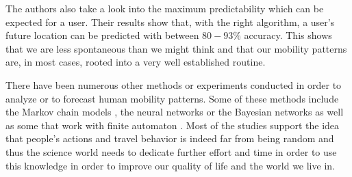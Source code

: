 The authors also take a look into the maximum predictability which can be
expected for a user. Their results show that, with the right algorithm, a user's
future location can be predicted with between $80-93\%$ accuracy. This shows
that we are less spontaneous than we might think and that our mobility patterns
are, in most cases, rooted into a very well established routine.

There have been numerous other methods or experiments conducted in order to
analyze or to forecast human mobility patterns. Some of these methods include the
Markov chain models \cite{Ross09} \cite{Liu96}, the neural networks \cite{Liou03}
or the Bayesian networks \cite{Akoush07} as well as some that work with finite
automaton \cite{Petzold04}. Most of the studies support the idea that people's
actions and travel behavior is indeed far from being random and thus the science
world needs to dedicate further effort and time in order to use this knowledge
in order to improve our quality of life and the world we live in.
